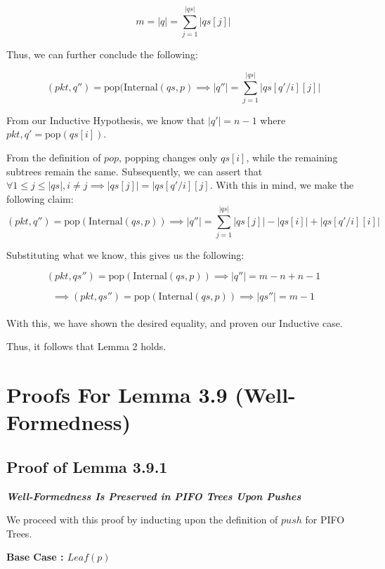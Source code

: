 \documentclass{article}
\begin{document}
$$m = |q| = \sum_{j=1}^{|qs|} |qs[j]|$$

\noindent Thus, we can further conclude the following:

$$(pkt, q'') = \text{pop}(\text{Internal}(qs, p) \implies |q''| = \sum_{j=1}^{|qs|} |qs[q'/i][j]|$$

\noindent From our Inductive Hypothesis, we know that $|q'| = n-1$ where $pkt, q' = \text{pop}(qs[i])$.\newline

\noindent From the definition of $pop$, popping changes only $qs[i]$, while the remaining subtrees remain the same. Subsequently, we can assert that $\forall 
1 \leq j \leq |qs|, i \neq j \implies |qs[j]| = |qs[q'/i][j]$. With this in mind, we make the following claim:\\[-15pt]

$$(pkt, q'') = \text{pop}(\text{Internal}(qs, p)) \implies |q''| = \sum_{j=1}^{|qs|} |qs[j]| - |qs[i]| + |qs[q'/i][i]|$$

\noindent Substituting what we know, this gives us the following:

$$(pkt, qs'') = \text{pop}(\text{Internal}(qs, p)) \implies |q''| = m - n + n - 1$$

$$\implies (pkt, qs'') = \text{pop}(\text{Internal}(qs, p)) \implies |qs''| = m - 1$$\\[-15pt]

\noindent With this, we have shown the desired equality, and proven our Inductive case.\newline

\noindent Thus, it follows that Lemma 2 holds.\newline


\section{Proofs For Lemma 3.9 (Well-Formedness)}

\subsection{Proof of Lemma 3.9.1}
\noindent \textit{\textbf{Well-Formedness Is Preserved in PIFO Trees Upon Pushes}}\newline

\noindent We proceed with this proof by inducting upon the definition of $push$ for PIFO Trees.\newline

\noindent \textbf{Base Case : $Leaf(p)$}\newline
\end{document}
